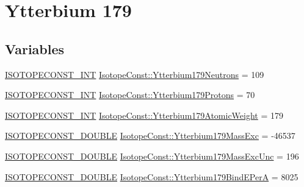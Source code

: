 \hypertarget{group___isotope_const-_ytterbium-_yb179}{}\section{Ytterbium 179}
\label{group___isotope_const-_ytterbium-_yb179}
\subsection*{Variables}
\begin{DoxyCompactItemize}
\item 
\mbox{\hyperlink{group___isotope_const-_macros_ga5f18360b3e99483a35c32d789e62621c}{I\+S\+O\+T\+O\+P\+E\+C\+O\+N\+S\+T\+\_\+\+I\+NT}} \mbox{\hyperlink{group___isotope_const-_ytterbium-_yb179_gad0d27b5834849b96f2a444cea7ecf66a}{Isotope\+Const\+::\+Ytterbium179\+Neutrons}} = 109
\item 
\mbox{\hyperlink{group___isotope_const-_macros_ga5f18360b3e99483a35c32d789e62621c}{I\+S\+O\+T\+O\+P\+E\+C\+O\+N\+S\+T\+\_\+\+I\+NT}} \mbox{\hyperlink{group___isotope_const-_ytterbium-_yb179_ga3539f4c91c83768dc3e0a896de61ffec}{Isotope\+Const\+::\+Ytterbium179\+Protons}} = 70
\item 
\mbox{\hyperlink{group___isotope_const-_macros_ga5f18360b3e99483a35c32d789e62621c}{I\+S\+O\+T\+O\+P\+E\+C\+O\+N\+S\+T\+\_\+\+I\+NT}} \mbox{\hyperlink{group___isotope_const-_ytterbium-_yb179_ga5d5d0991e1e7b9649e84f35a49daf5c4}{Isotope\+Const\+::\+Ytterbium179\+Atomic\+Weight}} = 179
\item 
\mbox{\hyperlink{group___isotope_const-_macros_ga8f45a7272ce02c0b4c65c44636ed719a}{I\+S\+O\+T\+O\+P\+E\+C\+O\+N\+S\+T\+\_\+\+D\+O\+U\+B\+LE}} \mbox{\hyperlink{group___isotope_const-_ytterbium-_yb179_ga356d2b53ba830e7f7bba97dd556b453b}{Isotope\+Const\+::\+Ytterbium179\+Mass\+Exc}} = -\/46537
\item 
\mbox{\hyperlink{group___isotope_const-_macros_ga8f45a7272ce02c0b4c65c44636ed719a}{I\+S\+O\+T\+O\+P\+E\+C\+O\+N\+S\+T\+\_\+\+D\+O\+U\+B\+LE}} \mbox{\hyperlink{group___isotope_const-_ytterbium-_yb179_ga9ea467ef73302341b2aa9a20903fbf5a}{Isotope\+Const\+::\+Ytterbium179\+Mass\+Exc\+Unc}} = 196
\item 
\mbox{\hyperlink{group___isotope_const-_macros_ga8f45a7272ce02c0b4c65c44636ed719a}{I\+S\+O\+T\+O\+P\+E\+C\+O\+N\+S\+T\+\_\+\+D\+O\+U\+B\+LE}} \mbox{\hyperlink{group___isotope_const-_ytterbium-_yb179_ga25a012d96c0fc1e09ef3b5b56a71681d}{Isotope\+Const\+::\+Ytterbium179\+Bind\+E\+PerA}} = 8025
\item 

\end{DoxyCompactItemize}
